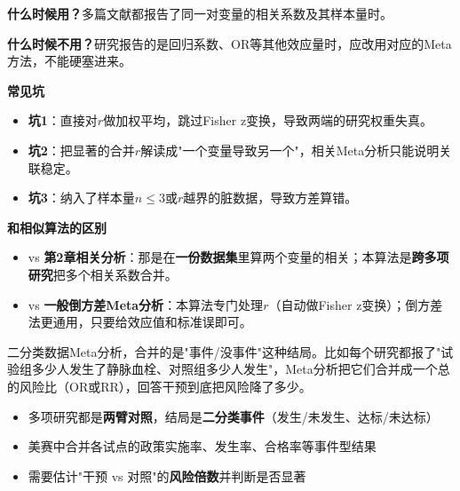 \begin{algonotes}
\textbf{什么时候用？}多篇文献都报告了同一对变量的相关系数及其样本量时。

\textbf{什么时候不用？}研究报告的是回归系数、OR等其他效应量时，应改用对应的Meta方法，不能硬塞进来。

\textbf{常见坑}
\begin{itemize}
    \item \textbf{坑1}：直接对$r$做加权平均，跳过Fisher z变换，导致两端的研究权重失真。
    \item \textbf{坑2}：把显著的合并$r$解读成"一个变量导致另一个"，相关Meta分析只能说明关联稳定。
    \item \textbf{坑3}：纳入了样本量$n\leq3$或$r$越界的脏数据，导致方差算错。
\end{itemize}

\textbf{和相似算法的区别}
\begin{itemize}
    \item vs \textbf{第2章相关分析}：那是在\textbf{一份数据集}里算两个变量的相关；本算法是\textbf{跨多项研究}把多个相关系数合并。
    \item vs \textbf{一般倒方差Meta分析}：本算法专门处理$r$（自动做Fisher z变换）；倒方差法更通用，只要给效应值和标准误即可。
\end{itemize}
\end{algonotes}


\begin{algointro}
二分类数据Meta分析，合并的是"事件/没事件"这种结局。比如每个研究都报了"试验组多少人发生了静脉血栓、对照组多少人发生"，Meta分析把它们合并成一个总的风险比（OR或RR），回答干预到底把风险降了多少。
\end{algointro}

\begin{algoscene}
\begin{itemize}
    \item 多项研究都是\textbf{两臂对照}，结局是\textbf{二分类事件}（发生/未发生、达标/未达标）
    \item 美赛中合并各试点的政策实施率、发生率、合格率等事件型结果
    \item 需要估计"干预 vs 对照"的\textbf{风险倍数}并判断是否显著
\end{itemize}
\end{algoscene}

